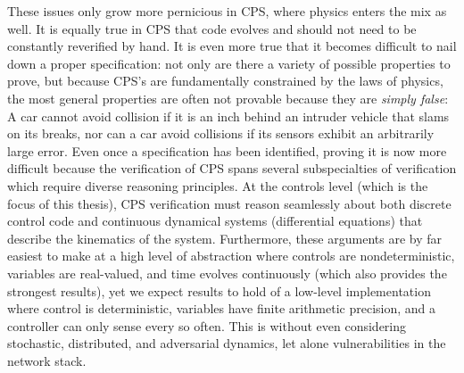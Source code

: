 \documentclass[12pt]{cmuthesis}
\theoremstyle{definition}
\theoremstyle{remark}
\begin{document}
These issues only grow more pernicious in CPS, where physics enters the mix as well.
It is equally true in CPS that code evolves and should not need to be constantly reverified by hand.
It is even more true that it becomes difficult to nail down a proper specification: not only are there a variety of possible properties to prove, but because CPS's are fundamentally constrained by the laws of physics, the most general properties are often not provable because they are \emph{simply false}: A car cannot avoid collision if it is an inch behind an intruder vehicle that slams on its breaks, nor can a car avoid collisions if its sensors exhibit an arbitrarily large error.
Even once a specification has been identified, proving it is now more difficult because the verification of CPS spans several subspecialties of verification which require diverse reasoning principles.
At the controls level (which is the focus of this thesis), CPS verification must reason seamlessly about both discrete control code and continuous dynamical systems (differential equations) that describe the kinematics of the system. Furthermore, these arguments are by far easiest to make at a high level of abstraction where controls are nondeterministic, variables are real-valued, and time evolves continuously (which also provides the strongest results), yet we expect results to hold of a low-level implementation where control is deterministic, variables have finite arithmetic precision, and a controller can only sense every so often.
This is without even considering stochastic, distributed, and adversarial dynamics, let alone vulnerabilities in the network stack.
\end{document}
